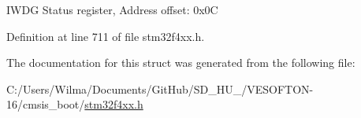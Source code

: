 I\+W\+DG Status register, Address offset\+: 0x0C 

Definition at line 711 of file stm32f4xx.\+h.



The documentation for this struct was generated from the following file\+:\begin{DoxyCompactItemize}
\item 
C\+:/\+Users/\+Wilma/\+Documents/\+Git\+Hub/\+S\+D\+\_\+\+H\+U\+\_/\+V\+E\+S\+O\+F\+T\+O\+N-\/16/cmsis\+\_\+boot/\hyperlink{stm32f4xx_8h}{stm32f4xx.\+h}\end{DoxyCompactItemize}
